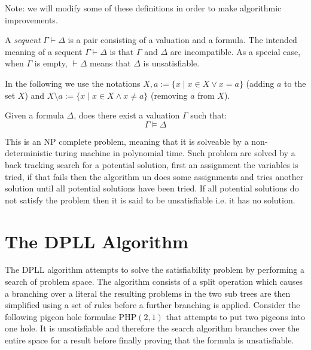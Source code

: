 \begin{mydef}[Preliminaries]
Note: we will modify some of these definitions in order to make algorithmic improvements.
\end{mydef}

%
A \emph{sequent} $\Gamma \vdash \Delta$ is a pair consisting of a valuation and a formula.
%
The intended meaning of a sequent $\Gamma \vdash \Delta$ is that $\Gamma$ and $\Delta$
are incompatible. As a special case, when $\Gamma$ is empty, $\vdash \Delta$ means that $\Delta$ is unsatisfiable. 
\begin{comment}
\begin{defi}
We define an equivalence relation $\sim$ over the formulae $\Delta_1$ and $\Delta_2$ as follows
$$\Delta_1 \sim \Delta_2 \leftrightarrow \forall C .( C \in \Delta_1 \leftrightarrow C \in \Delta_2) $$
\end{defi}
\end{comment}
%
In the following we use the notations $X,a := \{x \mid x\in X \lor x = a\}$ 
(adding $a$ to the set $X$) and 
$X\setminus a := \{x \mid x\in X \land x \neq a\}$ (removing $a$ from $X$).
%
\medskip
\begin{mydef}
Given a formula $\Delta$, does there exist a valuation $\Gamma$ such that:
$$\Gamma \models \Delta$$
\end{mydef}
This is an NP complete problem, meaning that it is solveable by a non-deterministic turing machine in polynomial time. Such problem are solved by a back tracking search for a potential solution, first an  assignment the variables is tried, if that fails then the algorithm un does some assignments and tries another solution until all potential solutions have been tried. If all potential solutions do not satisfy the problem then it is said to be unsatisfiable i.e. it has no solution.
\section{The DPLL Algorithm}
The DPLL algorithm attempts to solve the satisfiability problem by performing a search of problem space. The algorithm consists of a split operation which causes a branching over a literal the resulting problems in the two sub trees are then simplified using a set of rules before a further branching is applied. Consider the following pigeon hole formulae $\mathrm{PHP}(2,1)$ that attempts to put two pigeons into one hole. It is unsatisfiable and therefore the search algorithm branches over the entire space for a result before finally proving that the formula is unsatisfiable.

